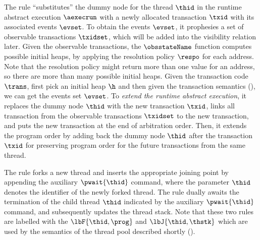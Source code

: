 The  rule ``substitutes'' the dummy node for the thread \( \thid \) in the runtime abstract execution \( \aexecrun \) with a newly allocated transaction \( \txid \) with its associated events \( \evset \).
To obtain the events \( \evset \), it prophesies a set of observable transactions \( \txidset \), which will be added into the visibility relation later.
Given the observable transactions, the \( \obsstateName \) function computes possible initial heaps, by applying the resolution policy \( \respo \) for each address.
Note that the resolution policy might return more than one value for an address, so there are more than many possible initial heaps.
Given the transaction code \( \trans \), first pick an initial heap \( \h \) and then given the transaction semantics (), we can get the events set \( \evset \).
To \emph{extend the runtime abstract execution}, it replaces the dummy node \( \thid \) with the new transaction \( \txid \), links all transaction from the observable transactions \( \txidset \) to the new transaction, and puts the new transaction at the end of arbitration order.
Then, it extends the program order by adding back the dummy node \( \thid \) after the transaction \( \txid \) for preserving program order for the future transactions from the same thread.

The  rule forks a new thread and inserts the appropriate joining point by appending the auxiliary \( \pwait{\thid} \) command, where the parameter \(\thid\) denotes the identifier of the newly forked thread.
The  rule dually awaits the termination of the child thread \(\thid\) indicated by the auxiliary \( \pwait{\thid} \) command, and subsequently updates the thread stack.
Note that these two rules are labelled with the \(\lbF{\thid, \prog}\) and \(\lbJ{\thid, \thstk}\) which are used by the semantics of the thread pool described shortly ().

